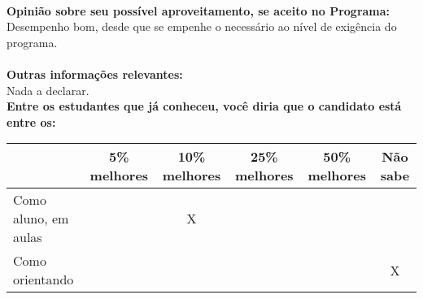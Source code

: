 \documentclass[11pt]{article}
\begin{document}
\\
\textbf{Opinião sobre seu possível aproveitamento, se aceito no Programa:}
\\Desempenho bom, desde que se empenhe o necessário ao nível de exigência do programa.\\ 
\\
\textbf{Outras informações relevantes:} \\Nada a declarar.
\\[0.3cm]
\textbf{Entre os estudantes que já conheceu, você diria que o candidato está entre os:}
\\
\begin{tabular}{|l|c|c|c|c|c|}
\hline
 & 5\% melhores & 10\% melhores & 25\% melhores & 50\% melhores & Não sabe \\
\hline
Como aluno, em aulas &  & X &  &  & \\
\hline
Como orientando &  &  &  &  & X\\
\hline
\end{tabular}
\end{document}
